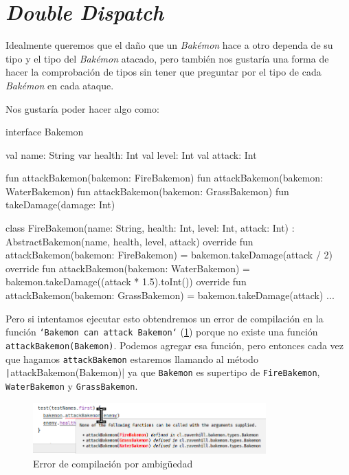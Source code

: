 \section{\textit{Double Dispatch}}
  Idealmente queremos que el daño que un \textit{Bakémon} hace a otro dependa de su tipo y el tipo 
  del \textit{Bakémon} atacado, pero también nos gustaría una forma de hacer la comprobación de 
  tipos sin tener que preguntar por el tipo de cada \textit{Bakémon} en cada ataque.

  Nos gustaría poder hacer algo como:

  \begin{kotlin}
    interface Bakemon {
      val name: String
      var health: Int
      val level: Int
      val attack: Int

      fun attackBakemon(bakemon: FireBakemon)
      fun attackBakemon(bakemon: WaterBakemon)
      fun attackBakemon(bakemon: GrassBakemon)
      fun takeDamage(damage: Int)
    }
  \end{kotlin}

  \begin{kotlin}
    class FireBakemon(name: String, health: Int, level: Int, attack: Int) :
        AbstractBakemon(name, health, level, attack) {
      override fun attackBakemon(bakemon: FireBakemon) = bakemon.takeDamage(attack / 2)
      override fun attackBakemon(bakemon: WaterBakemon) = 
        bakemon.takeDamage((attack * 1.5).toInt())
      override fun attackBakemon(bakemon: GrassBakemon) = bakemon.takeDamage(attack)
      ...
    }
  \end{kotlin}

  Pero si intentamos ejecutar esto obtendremos un error de compilación en la función
  \texttt{`Bakemon can attack Bakemon`} (\cref{fig:ambiguous-call-error}) porque
  no existe una función \texttt{attackBakemon(Bakemon)}.
  Podemos agregar esa función, pero entonces cada vez que hagamos \texttt{attackBakemon}
  estaremos llamando al método \texttt|attackBakemon(Bakemon)| ya que \texttt{Bakemon}
  es supertipo de \texttt{FireBakemon}, \texttt{WaterBakemon} y \texttt{GrassBakemon}.

  \begin{figure}[ht!]
    \centering
    \includegraphics[width=0.8\textwidth]{img/oop/dd/ambiguous-call-error.png}
    \caption{Error de compilación por ambigüedad}
    \label{fig:ambiguous-call-error}
  \end{figure}

